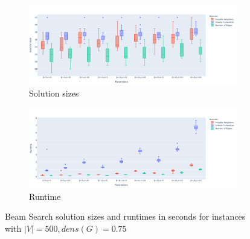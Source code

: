 \documentclass[draft,final]{vutinfth} %
\begin{document}
\begin{figure}
    \centering
    \begin{subfigure}{\textwidth}
        \centering
        \includegraphics[width=\textwidth]{graphics/lbh-075-500-size.pdf}
        \caption{Solution sizes}
    \end{subfigure}
    \begin{subfigure}{\textwidth}
        \centering
        \includegraphics[width=\textwidth]{graphics/lbh-075-500-runtime.pdf}
        \caption{Runtime}
    \end{subfigure}
    \caption{Beam Search solution sizes and runtimes in seconds for instances with $|V|=500, dens(G)=0.75$}
    \label{fig:bs-heuristics-random-1}
\end{figure}
\end{document}
